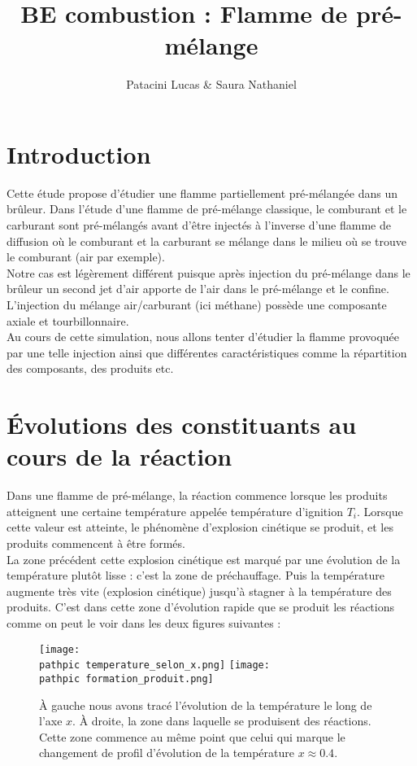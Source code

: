 \documentclass[a4paper,10pt]{article}
\title{ \dblue BE combustion : Flamme de pré-mélange}
\author{ \darker Patacini Lucas \& Saura Nathaniel}
\newcommand\pathpic{/home/saura/Documents/Latex_files/Pic/BE_combustion/tp2/}
\begin{document}
\maketitle 
\section*{Introduction}
Cette étude propose d'étudier une flamme partiellement pré-mélangée dans un brûleur. Dans l'étude d'une flamme de pré-mélange classique, le comburant et le carburant sont pré-mélangés avant d'être injectés à l'inverse d'une flamme de diffusion où le comburant et la carburant se mélange dans le milieu où se trouve le comburant (air par exemple). \\
Notre cas est légèrement différent puisque après injection du pré-mélange dans le brûleur un second jet d'air apporte de l'air dans le pré-mélange et le confine. L'injection du mélange air/carburant (ici méthane) possède une composante axiale et tourbillonnaire.\\
 Au cours de cette simulation, nous allons tenter d'étudier la flamme provoquée par une telle injection ainsi que différentes caractéristiques comme la répartition des composants, des produits etc.   

\section{Évolutions des constituants au cours de la réaction}
Dans une flamme de pré-mélange, la réaction commence lorsque les produits atteignent une certaine température appelée température d'ignition $T_i$. Lorsque cette valeur est atteinte, le phénomène d'explosion cinétique se produit, et les produits commencent à être formés. \\
La zone précédent cette explosion cinétique est marqué par une évolution de la température plutôt lisse : c'est la zone de préchauffage. Puis la température augmente très vite (explosion cinétique) jusqu'à stagner à la température des produits. C'est dans cette zone d'évolution rapide que se produit les réactions comme on peut le voir dans les deux figures suivantes : 

\begin{figure}[ht!]
\centering
\texttt{[image: \\pathpic temperature\_selon\_x.png]} \hfill
\texttt{[image: \\pathpic formation\_produit.png]}
\caption{À gauche nous avons tracé l'évolution de la température le long de l'axe $x$. À droite, la zone dans laquelle se produisent des réactions. Cette zone commence au même point que celui qui marque le changement de profil d'évolution de la température $x \approx 0.4$.}
\end{figure}
\end{document}
